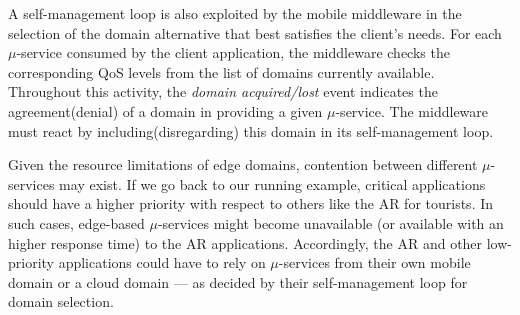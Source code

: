 


A self-management loop is also exploited by the mobile middleware in the selection of the domain alternative that best satisfies the client's needs. For each $\mu$-service consumed by the client application, the middleware checks the corresponding QoS levels from the list of domains currently available. %
Throughout this activity, the \textit{domain acquired/lost} event indicates the agreement(denial) of a domain in providing a given $\mu$-service. The middleware must react by including(disregarding) this domain in its self-management loop. %

Given the resource limitations of edge domains, contention between different $\mu$-services may exist. If we go back to our running example,
critical applications should have a higher priority with respect to others like the AR for tourists. In such cases, edge-based $\mu$-services might become unavailable (or available with an higher response time) to the AR applications. Accordingly, the AR and other low-priority applications could have to rely on $\mu$-services from their own mobile domain or a cloud domain --- as decided by their self-management loop for domain selection. 


